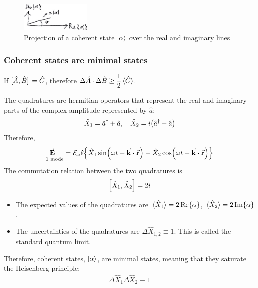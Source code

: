 \begin{figure}[H]
	\centering
	\includegraphics[width=0.3\textwidth]{./images/4-coherent-rep}
	\caption{Projection of a coherent state $\ket{\alpha}$ over the real and imaginary lines}
	\label{fig:coherent-rep}
\end{figure}

\subsubsection*{Coherent states are minimal states}
\begin{thm}
	If $\comm*{\hat{A}}{\hat{B}} = \hat{C}$, therefore $\Delta \hat{A} \cdot \Delta \hat{B} \geq \dfrac{1}{2}\ev*{\hat{C}}$.
\end{thm}

\begin{defi}
	The quadratures are hermitian operators that represent the real and imaginary parts of the complex amplitude represented by $\hat{a}$:
	\begin{align}
		\hat{X}_{1} = \hat{a}\sdag + \hat{a} \qc \hat{X}_{2} = i \qty(\hat{a}\sdag - \hat{a})
	\end{align}
	Therefore,
	\begin{align*}
		\underset{1\text{ mode}}{\trn{\va{E}}} = \mc{E}_{\omega} \vu{\epsilon} \qty{ \hat{X}_{1} \sin(\omega t - \va{k}\vdot\va{r}) - \hat{X}_{2} \cos(\omega t - \va{k}\vdot\va{r}) }
	\end{align*}
	The commutation relation between the two quadratures is
	\begin{align}
		\comm{\hat{X}_{1}}{\hat{X}_{2}} = 2i
	\end{align}
\end{defi}

\begin{itemize}
	\item The expected values of the quadratures are $\ev*{\hat{X}_{1}} = 2 \Re{\alpha}$, $\ev*{\hat{X}_{2}} = 2 \Im{\alpha}$.
	\item The uncertainties of the quadratures are $\Delta \hat{X}_{1,2} \equiv 1$. This is called the standard quantum limit.
\end{itemize}

Therefore, coherent states, $\ket{\alpha}$, are minimal states, meaning that they saturate the Heisenberg principle:
\begin{align}
	\Delta \hat{X}_{1} \Delta \hat{X}_{2} \equiv 1
\end{align}

